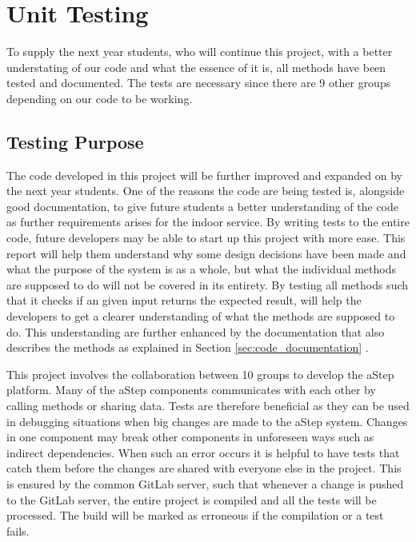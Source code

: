 \section{Unit Testing}\label{sec:unit_test}
To supply the next year students, who will continue this project, with a better understating of our code and what the essence of it is, all methods have been tested and documented. 
The tests are necessary since there are 9 other groups depending on our code to be working.

\subsection{Testing Purpose}
The code developed in this project will be further improved and expanded on by the next year students. One of the reasons the code are being tested is, alongside good documentation, to give future students a better understanding of the code as further requirements arises for the indoor service. 
By writing tests to the entire code, future developers may be able to start up this project with more ease. 
This report will help them understand why some design decisions have been made and what the purpose of the system is as a whole, but what the individual methods are supposed to do will not be covered in its entirety. 
By testing all methods such that it checks if an given input returns the expected result, will help the developers to get a clearer understanding of what the methods are supposed to do. 
This understanding are further enhanced by the documentation that also describes the methods as explained in Section \ref{sec:code_documentation} . 

This project involves the collaboration between 10 groups to develop the aStep platform. 
Many of the aStep components communicates with each other by calling methods or sharing data.
Tests are therefore beneficial as they can be used in debugging situations when big changes are made to the aStep system. 
Changes in one component may break other components in unforeseen ways such as indirect dependencies.
When such an error occurs it is helpful to have tests that catch them before the changes are shared with everyone else in the project. This is ensured by the common GitLab server, such that whenever a change is pushed to the GitLab server, the entire project is compiled and all the tests will be processed. The build will be marked as erroneous if the compilation or a test fails.


